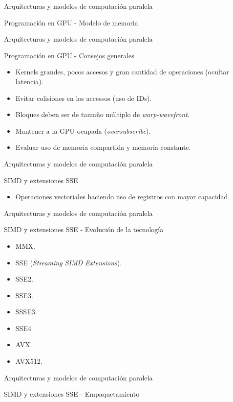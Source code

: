 \begin{frame}{Arquitecturas y modelos de computación paralela}
\begin{block}{Programación en GPU - Modelo de memoria}
\centerline{}
\end{block}
\end{frame}

\begin{frame}{Arquitecturas y modelos de computación paralela}
\begin{block}{Programación en GPU - Consejos generales}
\begin{itemize}
  \item Kernels grandes, pocos accesos y gran cantidad de operaciones (ocultar latencia).
  \item Evitar colisiones en los accessos (uso de IDs).
  \item Bloques deben ser de tamaño múltiplo de \textit{warp-wavefront}.
  \item Mantener a la GPU ocupada (\textit{oversubscribe}).
  \item Evaluar uso de memoria compartida y memoria constante.
\end{itemize}
\end{block}
\end{frame}

\begin{frame}{Arquitecturas y modelos de computación paralela}
\begin{block}{SIMD y extensiones SSE}
\begin{itemize}
  \item Operaciones vectoriales haciendo uso de registros con mayor capacidad.
\end{itemize}
  \centerline{}
\end{block}
\end{frame}

\begin{frame}{Arquitecturas y modelos de computación paralela}
\begin{block}{SIMD y extensiones SSE - Evolución de la tecnología}
\begin{itemize}
  \item MMX.
  \item SSE (\textit{Streaming SIMD Extensions}).
  \item SSE2.
  \item SSE3.
  \item SSSE3.
  \item SSE4
  \item AVX.
  \item AVX512.
\end{itemize}
\end{block}
\end{frame}

\begin{frame}{Arquitecturas y modelos de computación paralela}
\begin{block}{SIMD y extensiones SSE - Empaquetamiento}
  \centerline{}
\end{block}
\end{frame}